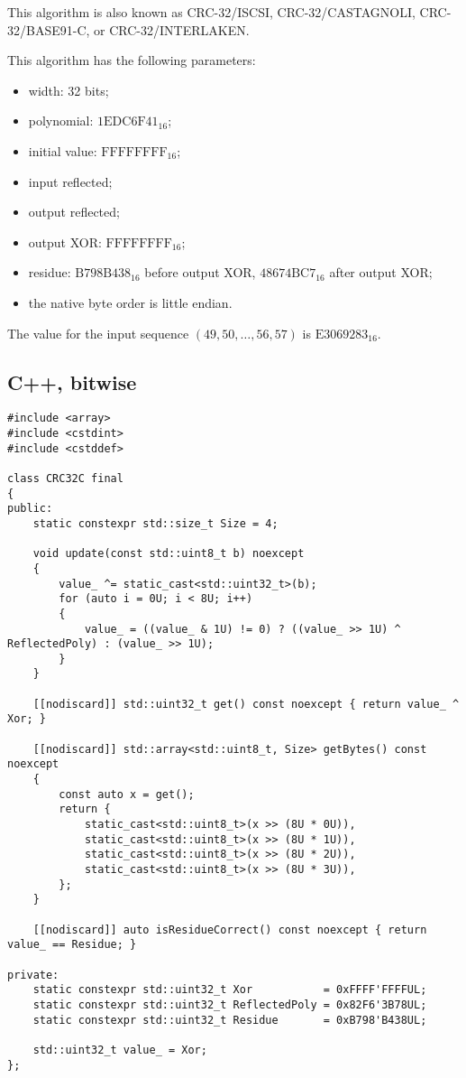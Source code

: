 This algorithm is also known as CRC-32/ISCSI, CRC-32/CASTAGNOLI, CRC-32/BASE91-C, or CRC-32/INTERLAKEN.

This algorithm has the following parameters:
\begin{itemize}
    \item width: 32 bits;
    \item polynomial: $\mathrm{1EDC6F41}_{16}$;
    \item initial value: $\mathrm{FFFFFFFF}_{16}$;
    \item input reflected;
    \item output reflected;
    \item output XOR: $\mathrm{FFFFFFFF}_{16}$;
    \item residue: $\mathrm{B798B438}_{16}$ before output XOR, $\mathrm{48674BC7}_{16}$ after output XOR;
    \item the native byte order is little endian.
\end{itemize}

The value for the input sequence $\left(49, 50, \ldots, 56, 57\right)$ is $\mathrm{E3069283}_{16}$.

\subsection{C++, bitwise}

\begin{samepage}
\begin{verbatim}
#include <array>
#include <cstdint>
#include <cstddef>

class CRC32C final
{
public:
    static constexpr std::size_t Size = 4;

    void update(const std::uint8_t b) noexcept
    {
        value_ ^= static_cast<std::uint32_t>(b);
        for (auto i = 0U; i < 8U; i++)
        {
            value_ = ((value_ & 1U) != 0) ? ((value_ >> 1U) ^ ReflectedPoly) : (value_ >> 1U);
        }
    }

    [[nodiscard]] std::uint32_t get() const noexcept { return value_ ^ Xor; }

    [[nodiscard]] std::array<std::uint8_t, Size> getBytes() const noexcept
    {
        const auto x = get();
        return {
            static_cast<std::uint8_t>(x >> (8U * 0U)),
            static_cast<std::uint8_t>(x >> (8U * 1U)),
            static_cast<std::uint8_t>(x >> (8U * 2U)),
            static_cast<std::uint8_t>(x >> (8U * 3U)),
        };
    }

    [[nodiscard]] auto isResidueCorrect() const noexcept { return value_ == Residue; }

private:
    static constexpr std::uint32_t Xor           = 0xFFFF'FFFFUL;
    static constexpr std::uint32_t ReflectedPoly = 0x82F6'3B78UL;
    static constexpr std::uint32_t Residue       = 0xB798'B438UL;

    std::uint32_t value_ = Xor;
};
\end{verbatim}
\end{samepage}


